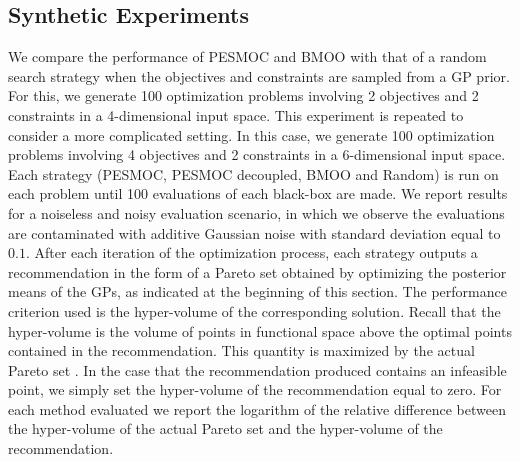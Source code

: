 \documentclass[review,preprint,12pt]{elsarticle}
\begin{document}

\subsection{Synthetic Experiments}

We compare the performance of PESMOC and BMOO with that of a random search strategy when the objectives and 
constraints are sampled from a GP prior. For this, we generate 100 optimization problems involving 2 objectives 
and 2 constraints in a 4-dimensional input space. This experiment is repeated to consider a more complicated setting.
In this case, we generate 100 optimization problems involving 4 objectives and 2 constraints in a 6-dimensional input 
space.  Each strategy (PESMOC, PESMOC decoupled, BMOO and Random) is run on each problem until 100 evaluations of each 
black-box are made. We report results for a noiseless and noisy evaluation scenario, in which we observe the evaluations 
are contaminated with additive Gaussian noise with standard deviation equal to $0.1$.  After each iteration of the optimization
process, each strategy outputs a recommendation in the form of a Pareto set obtained by optimizing the posterior means of the GPs,
as indicated at the beginning of this section. The performance criterion used is the hyper-volume of the corresponding 
solution. Recall that  the hyper-volume is the volume of points in functional space above the optimal points contained
in the recommendation. This quantity is maximized by the actual Pareto set \citep{zitzler1999multiobjective}. 
In the case that the recommendation produced contains an infeasible point, we 
simply set the hyper-volume of the recommendation equal to zero. For each method evaluated we report the logarithm of 
the relative difference between the hyper-volume of the actual Pareto set and the hyper-volume of the recommendation. 
\end{document}
